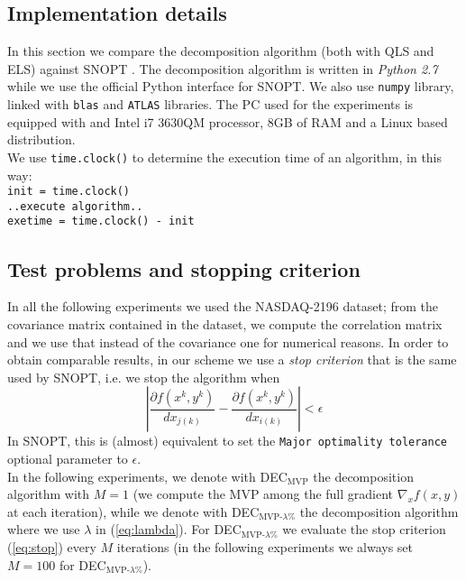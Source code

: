 
\subsection{Implementation details}
In this section we compare the decomposition algorithm (both with QLS and ELS) against SNOPT \cite{snopt}.
The decomposition algorithm is written in \textit{Python 2.7} while we use the official Python interface for SNOPT. We also use \texttt{numpy} library, linked with \texttt{blas} and \texttt{ATLAS} libraries. The PC used for the experiments is equipped with and Intel i7 3630QM processor, 8GB of RAM and a Linux based distribution.\\
We use \texttt{time.clock()} to determine the execution time of an algorithm, in this way:\\
\texttt{init = time.clock()}\\
\texttt{..execute algorithm..}\\
\texttt{exetime = time.clock() - init}\\

\subsection{Test problems and stopping criterion}
In all the following experiments we used the NASDAQ-2196 dataset\footnotemark[1]; from the covariance matrix contained in the dataset, we compute the correlation matrix and we use that instead of the covariance one for numerical reasons. 
In order to obtain comparable results, in our scheme we use a \textit{stop criterion} that is the same used by SNOPT, i.e. we stop the algorithm when
\begin{equation}\label{eq:stop}
\left| \frac{\partial f(x^k,y^k)}{d{x_{j(k)}}} - \frac{\partial f(x^k,y^k)}{d{x_{i(k)}} }\right| < \epsilon
\end{equation}
In SNOPT, this is (almost) equivalent to set the \texttt{Major optimality tolerance} optional parameter to $\epsilon$.\\
In the following experiments, we denote with DEC$_{\text{MVP}}$ the decomposition algorithm with $M=1$ (we compute the MVP among the full gradient $\nabla_x f(x,y)$ at each iteration), while we denote with DEC$_{\text{MVP-}\lambda\%}$ the decomposition algorithm where we use $\lambda$ in (\ref{eq:lambda}). For DEC$_{\text{MVP-}\lambda\%}$ we evaluate the stop criterion (\ref{eq:stop}) every $M$ iterations (in the following experiments we always set $M=100$ for DEC$_{\text{MVP-}\lambda\%}$).


